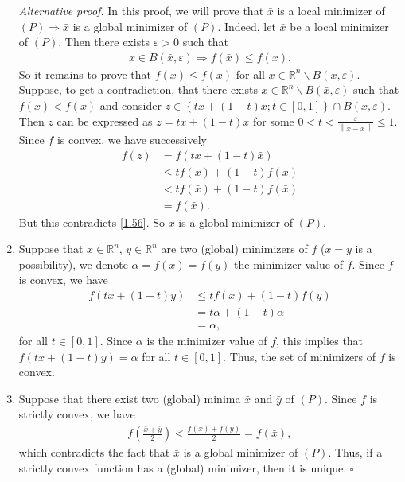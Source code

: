 \documentclass[a4paper]{article}
\numberwithin{equation}{section}
\begin{document}
\begin{enumerate}
\textit{Alternative proof.} In this proof, we will prove that $\bar x$ is a local minimizer of $\left(P\right) \Rightarrow \bar x$ is a global minimizer of $\left(P\right)$. Indeed, let $\bar x$ be a local minimizer of $\left(P\right)$. Then there exists $\varepsilon >0$ such that 
\begin{align}
\label{1.56}
x \in B\left( {\bar x,\varepsilon } \right) \Rightarrow f\left( {\bar x} \right) \le f\left( x \right).
\end{align}
So it remains to prove that $f\left(\bar x\right) \le f\left(x\right)$ for all $x \in {\mathbb{R}^n}\backslash B\left( {\bar x,\varepsilon } \right)$. Suppose, to get a contradiction, that there exists $x \in {\mathbb{R}^n}\backslash B\left( {\bar x,\varepsilon } \right)$ such that $f\left(x\right) < f\left(\bar x\right)$ and consider $z \in \left\{ {tx + \left( {1 - t} \right)\bar x;t \in \left[ {0,1} \right]} \right\} \cap B\left( {\bar x,\varepsilon } \right) $. Then $z$ can be expressed as $z = tx + \left( {1 - t} \right)\bar x$ for some $0 < t < \frac{\varepsilon }{{\left\| {x - \bar x} \right\|}} \le 1$. Since $f$ is convex, we have successively
\begin{align}
f\left( z \right) &= f\left( {tx + \left( {1 - t} \right)\bar x} \right)\\
 &\le tf\left( x \right) + \left( {1 - t} \right)f\left( {\bar x} \right)\\
& < tf\left( {\bar x} \right) + \left( {1 - t} \right)f\left( {\bar x} \right)\\
 &= f\left( {\bar x} \right).
\end{align}
But this contradicts \eqref{1.56}. So $\bar x$ is a global minimizer of $\left(P\right)$.
\item Suppose that $x \in \mathbb{R}^n$, $y\in \mathbb{R}^n$ are two (global) minimizers of $f$ ($x=y$ is a possibility), we denote $\alpha  = f\left( x \right) = f\left( y \right)$ the minimizer value of $f$. Since $f$ is convex, we have
\begin{align}
f\left( {tx + \left( {1 - t} \right)y} \right) &\le tf\left( x \right) + \left( {1 - t} \right)f\left( y \right)\\
& = t\alpha  + \left( {1 - t} \right)\alpha \\
& = \alpha ,
\end{align}
for all $t\in \left[0,1\right]$. Since $\alpha$ is the minimizer value of $f$, this implies that $f\left( {tx + \left( {1 - t} \right)y} \right) = \alpha $ for all $t\in \left[0,1\right]$. Thus, the set of minimizers of $f$ is convex.
\item Suppose that there exist two (global) minima $\bar x$ and $\bar y$ of $\left(P\right)$. Since $f$ is strictly convex, we have
\begin{align}
f\left( {\frac{{\bar x + \bar y}}{2}} \right) < \frac{{f\left( {\bar x} \right) + f\left( {\bar y} \right)}}{2} = f\left( {\bar x} \right),
\end{align}
which contradicts the fact that $\bar x$  is a global minimizer of $\left(P\right)$. Thus, if a strictly convex function has a (global) minimizer, then it is unique. \hfill $\square$
\end{enumerate}
\end{document}

